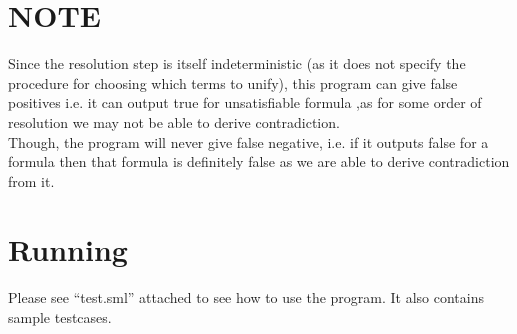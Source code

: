 \documentclass{article}
\begin{document}
\section*{NOTE}
Since the resolution step is itself indeterministic (as it does not specify the procedure for choosing which
terms to unify), this program can give false positives i.e. it can output true for unsatisfiable formula
,as for some order of resolution we may not be able to derive contradiction.\\
Though, the program will never give false negative, i.e. if it outputs false for a formula then that
formula is definitely false as we are able to derive contradiction from it.

\section*{Running}
Please see ``test.sml'' attached to see how to use the program. It also contains sample testcases.
\end{document}
